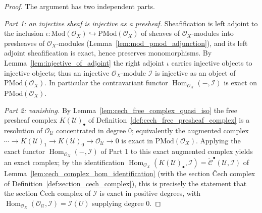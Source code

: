 \begin{proof}
  The argument has two independent parts.

  \emph{Part 1: an injective sheaf is injective as a presheaf.} Sheafification is
  left adjoint to the inclusion
  \(\iota : \mathrm{Mod}(\mathcal{O}_X) \hookrightarrow \mathrm{PMod}(\mathcal{O}_X)\)
  of sheaves of \(\mathcal{O}_X\)-modules into presheaves of
  \(\mathcal{O}_X\)-modules (Lemma~\ref{lem:mod_pmod_adjunction}), and its left
  adjoint sheafification is exact, hence preserves monomorphisms. By
  Lemma~\ref{lem:injective_of_adjoint} the right adjoint \(\iota\) carries injective
  objects to injective objects; thus an injective \(\mathcal{O}_X\)-module
  \(\mathcal{I}\) is injective as an object of \(\mathrm{PMod}(\mathcal{O}_X)\). In
  particular the contravariant functor \(\operatorname{Hom}_{\mathcal{O}_X}(-,
  \mathcal{I})\) is exact on \(\mathrm{PMod}(\mathcal{O}_X)\).

  \emph{Part 2: vanishing.} By Lemma~\ref{lem:cech_free_complex_quasi_iso} the free
  presheaf complex \(K(\mathcal{U})_\bullet\) of
  Definition~\ref{def:cech_free_presheaf_complex} is a resolution of
  \(\mathcal{O}_{\mathcal{U}}\) concentrated in degree \(0\); equivalently the
  augmented complex \(\cdots \to K(\mathcal{U})_1 \to K(\mathcal{U})_0 \to
  \mathcal{O}_{\mathcal{U}} \to 0\) is exact in \(\mathrm{PMod}(\mathcal{O}_X)\).
  Applying the exact functor \(\operatorname{Hom}_{\mathcal{O}_X}(-, \mathcal{I})\)
  of Part 1 to this exact augmented complex yields an exact complex; by the
  identification \(\operatorname{Hom}_{\mathcal{O}_X}(K(\mathcal{U})_\bullet,
  \mathcal{I}) = \check{\mathcal{C}}^\bullet(\mathcal{U}, \mathcal{I})\) of
  Lemma~\ref{lem:cech_complex_hom_identification} (with the section {\v C}ech complex
  of Definition~\ref{def:section_cech_complex}), this is precisely the statement that
  the section {\v C}ech complex of \(\mathcal{I}\) is exact in positive degrees, with
  \(\operatorname{Hom}_{\mathcal{O}_X}(\mathcal{O}_{\mathcal{U}}, \mathcal{I}) =
  \mathcal{I}(U)\) supplying degree \(0\).


\end{proof}
